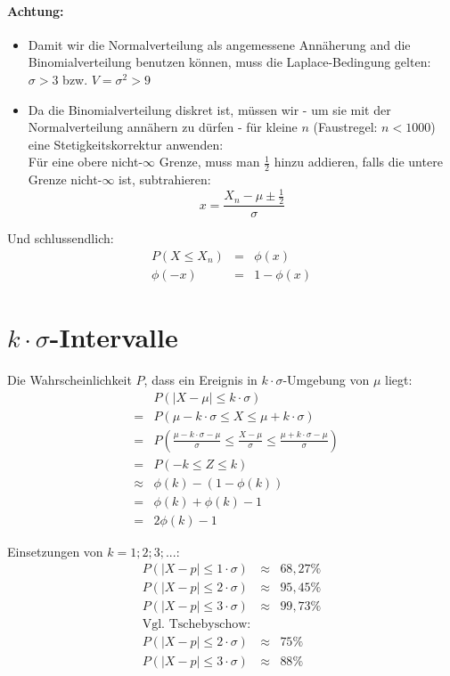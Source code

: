 \documentclass[12pt,a4paper,twocolumn]{article}
\begin{document}
\paragraph{Achtung:}
 \begin{itemize}
   \item Damit wir die Normalverteilung als angemessene Annäherung and die Binomialverteilung benutzen können, muss die Laplace-Bedingung gelten: $\sigma>3$ bzw. $V=\sigma^2>9$\\
  \item Da die Binomialverteilung diskret ist, müssen wir - um sie mit der Normalverteilung annähern zu dürfen - für kleine $n$ (Faustregel: $n<1000$) eine Stetigkeitskorrektur anwenden:\\
  Für eine obere nicht-$\infty$ Grenze, muss man $\frac{1}{2}$ hinzu addieren, falls die untere Grenze nicht-$\infty$ ist, subtrahieren:
   $$x = \frac{X_n - \mu \pm \frac{1}{2}}{\sigma}$$
 \end{itemize}


Und schlussendlich:
\begin{eqnarray}
P(X \le X_n) &=& \phi(x) \\ %
\phi(-x) &=& 1 - \phi(x)
\end{eqnarray}

\section{$k\cdot\sigma$-Intervalle}
Die Wahrscheinlichkeit $P$, dass ein Ereignis in $k \cdot \sigma$-Umgebung von $\mu$ liegt:\\

\begin{eqnarray}
& &P(|X-\mu |\le k\cdot\sigma)\\
 &=& P(\mu-k\cdot\sigma\le X \le \mu + k\cdot\sigma)\\
&=& P\left(\frac{\mu-k\cdot\sigma - \mu}{\sigma}\le \frac{X - \mu}{\sigma}\le \frac{\mu + k\cdot\sigma - \mu}{\sigma}\right) \nonumber \\
&=& P(-k \le Z \le k)\\
&\approx& \phi(k) - (1 - \phi(k))\\
&=& \phi(k) + \phi(k) - 1\\
&=& 2\phi(k)- 1
\end{eqnarray}

Einsetzungen von $ k = {1;2;3; ...}$:
\begin{eqnarray}
P(|X-p|\le 1\cdot\sigma) &\approx& 68,27 \%\\
P(|X-p|\le 2\cdot\sigma) &\approx& 95,45 \%\\
P(|X-p|\le 3\cdot\sigma) &\approx& 99,73 \%\\
\text{Vgl. Tschebyschow:} \nonumber \\
P(|X-p|\le 2\cdot\sigma) &\approx& 75 \%\\
P(|X-p|\le 3\cdot\sigma) &\approx& 88 \%
\end{eqnarray}
\end{document}
